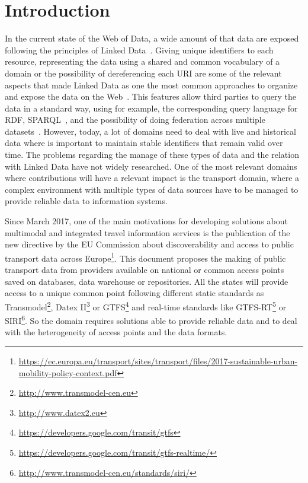 \documentclass[sw]{iosart2x}
\begin{document}
	\section{Introduction}\label{introduction} %
	In the current state of the Web of Data, a wide amount of that data are exposed following the principles of Linked Data~\cite{bizer2009linked}. Giving unique identifiers to each resource, representing the data using a shared and common vocabulary of a domain or the possibility of dereferencing each URI are some of the relevant aspects that made Linked Data as one the most common approaches to organize and expose the data on the Web~\cite{heath2011linked}. This features allow third parties to query the data in a standard way, using for example, the corresponding query language for RDF, SPARQL~\cite{prud2006sparql}, and the possibility of doing federation across multiple datasets~\cite{buil2013federating}. However, today, a lot of domains need to deal with live and historical data where is important to maintain stable identifiers that remain valid over time. The problems regarding the manage of these types of data and the relation with Linked Data have not widely researched. One of the most relevant domains where contributions will have a relevant impact is the transport domain, where a complex environment with multiple types of data sources have to be managed to provide reliable data to information systems.
	
	Since March 2017, one of the main motivations for developing solutions about multimodal and integrated travel information services is the publication of the new directive by the EU Commission about discoverability and access to public transport data across Europe\footnote{\url{https://ec.europa.eu/transport/sites/transport/files/2017-sustainable-urban-mobility-policy-context.pdf}}. This document proposes the making of public transport data from providers available on national or common access points saved on databases, data warehouse or repositories. All the states will provide access to a unique common point following different static standards as Transmodel\footnote{\url{http://www.transmodel-cen.eu}}, Datex II\footnote{\url{http://www.datex2.eu}} or GTFS\footnote{\url{https://developers.google.com/transit/gtfs}} and real-time standards like GTFS-RT\footnote{\url{https://developers.google.com/transit/gtfs-realtime/}} or SIRI\footnote{\url{http://www.transmodel-cen.eu/standards/siri/}}. So the domain requires solutions able to provide reliable data and to deal with the heterogeneity of access points and the data formats.
	
\end{document}
